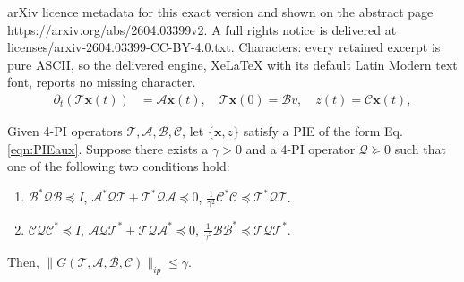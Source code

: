 \documentclass[10pt,a4paper]{amsart}
\newcommand{\mbf}[1]{\mathbf{#1}}
\newcommand{\mcl}[1]{\mathcal{#1}}
\newcommand{\norm}[1]{\lVert#1\rVert}
\begin{document}
arXiv licence metadata for this exact version and shown on the abstract page https://arxiv.org/abs/2604.03399v2. A full rights notice is delivered at licenses/arxiv-2604.03399-CC-BY-4.0.txt. Characters: every retained excerpt is pure ASCII, so the delivered engine, XeLaTeX with its default Latin Modern text font, reports no missing character.
\begin{align}\label{eqn:PIEaux}
\partial_t (\mcl T \mbf x(t))&= \mcl A \mbf x(t),\quad \mcl T \mbf{x}(0) =\mcl{B} v,\quad z(t)=\mcl C \mbf x(t),
\end{align}

\begin{theorem}\label{thm:Normcoercive}
    Given 4-PI operators ${\mathcal{T},\mathcal{A},\mathcal{B},\mathcal{C}}$, let $\{\mbf x, z\}$ satisfy a PIE of the form
    Eq. \eqref{eqn:PIEaux}. Suppose there exists a $\gamma>0$ and a 4-PI operator $\mcl Q \succeq 0$ such that one of the following two conditions hold:
    \begin{enumerate}[leftmargin=*]
        \item[(i)] $\mathcal{B}^*\mcl Q\mathcal{B}\preceq I$, $\mathcal{A}^*\mcl Q\mathcal{T}+\mathcal{T}^*\mcl Q\mathcal{A} \preceq 0$, $\frac{1}{\gamma^2}\mathcal{C}^*\mathcal{C} \preceq \mathcal{T}^*\mcl Q\mathcal{T}$.
        \item[(ii)] $\mathcal{C}\mcl Q\mathcal{C}^*\preceq I$, $\mathcal{A}\mcl Q\mathcal{T}^*+\mathcal{T}\mcl Q\mathcal{A}^* \preceq 0$, $\frac{1}{\gamma^2}\mathcal{B}\mathcal{B}^* \preceq \mathcal{T}\mcl Q\mathcal{T}^*$.
    \end{enumerate} 
    Then, $\norm{G(\mcl T, \mcl A,\mcl B,\mcl C)}_{ip} \le \gamma$.
\end{theorem}
\end{document}
